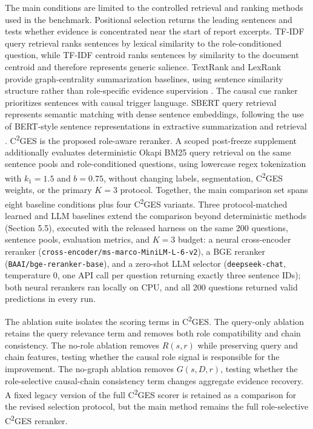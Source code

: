 \documentclass{article}
\begin{document}
The main conditions are limited to the controlled retrieval and ranking methods used in the benchmark. Positional selection returns the leading sentences and tests whether evidence is concentrated near the start of report excerpts. TF-IDF query retrieval ranks sentences by lexical similarity to the role-conditioned question, while TF-IDF centroid ranks sentences by similarity to the document centroid and therefore represents generic salience. TextRank and LexRank provide graph-centrality summarization baselines, using sentence similarity structure rather than role-specific evidence supervision \cite{khor2021text,belwal2020graphbased}. The causal cue ranker prioritizes sentences with causal trigger language. SBERT query retrieval represents semantic matching with dense sentence embeddings, following the use of BERT-style sentence representations in extractive summarization and retrieval \cite{abdelsalam2022performance,feng2022languageagnostic}. C\textsuperscript{2}GES is the proposed role-aware reranker. A scoped post-freeze supplement additionally evaluates deterministic Okapi BM25 query retrieval on the same sentence pools and role-conditioned questions, using lowercase regex tokenization with $k_1=1.5$ and $b=0.75$, without changing labels, segmentation, C\textsuperscript{2}GES weights, or the primary $K=3$ protocol. Together, the main comparison set spans eight baseline conditions plus four C\textsuperscript{2}GES variants. Three protocol-matched learned and LLM baselines extend the comparison beyond deterministic methods (Section 5.5), executed with the released harness on the same 200 questions, sentence pools, evaluation metrics, and $K=3$ budget: a neural cross-encoder reranker (\texttt{cross-encoder/ms-marco-MiniLM-L-6-v2}), a BGE reranker (\texttt{BAAI/bge-reranker-base}), and a zero-shot LLM selector (\texttt{deepseek-chat}, temperature 0, one API call per question returning exactly three sentence IDs); both neural rerankers ran locally on CPU, and all 200 questions returned valid predictions in every run.

The ablation suite isolates the scoring terms in C\textsuperscript{2}GES. The query-only ablation retains the query relevance term and removes both role compatibility and chain consistency. The no-role ablation removes $R(s,r)$ while preserving query and chain features, testing whether the causal role signal is responsible for the improvement. The no-graph ablation removes $G(s,D,r)$, testing whether the role-selective causal-chain consistency term changes aggregate evidence recovery. A fixed legacy version of the full C\textsuperscript{2}GES scorer is retained as a comparison for the revised selection protocol, but the main method remains the full role-selective C\textsuperscript{2}GES reranker.
\end{document}
